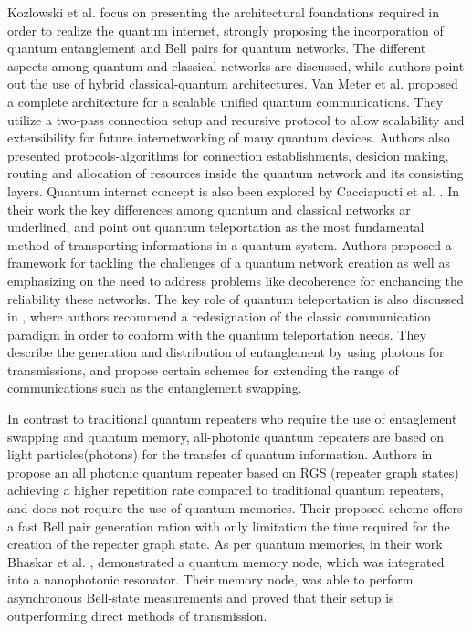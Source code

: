 \documentclass[12pt,a4paper] {report}
\begin{document}
		Kozlowski et al. \cite{rfc} focus on presenting the architectural foundations required in order to
		realize the quantum internet, strongly proposing the incorporation of quantum entanglement and Bell pairs for quantum networks. 
		The different aspects among quantum and classical networks are discussed, while authors point out the use of hybrid
		classical-quantum architectures. Van Meter et al. \cite{quantum-arch} proposed a complete architecture 
		for a scalable unified quantum communications. They utilize a two-pass connection setup and recursive protocol
		to allow scalability and extensibility for future internetworking
		of many quantum devices. Authors also presented protocols-algorithms for connection establishments, desicion making, routing and 
		allocation of resources inside the quantum network and its consisting layers.
		Quantum internet concept is also been explored by Cacciapuoti et al. \cite{net-chall-dqc}.
		In their work the key differences among quantum and classical
		networks ar underlined, and point out quantum teleportation as the most fundamental method of transporting 
		informations in a quantum system. Authors proposed a framework for tackling the challenges of a quantum
		network creation as well as emphasizing on the need to address problems like decoherence for enchancing the
		reliability these networks. The key role of quantum teleportation is also discussed in \cite{entagl-classic},
		where authors recommend a redesignation of the classic communication paradigm in order to conform with the quantum teleportation needs.
		They describe the generation and distribution of entanglement by using photons for transmissions, and propose certain schemes for extending
		the range of communications such as the entanglement swapping.

		In contrast to traditional quantum repeaters who require the use of entaglement swapping and quantum memory, all-photonic quantum repeaters
		are based on light particles(photons) for the transfer of quantum information.
		Authors in \cite{repeater1} propose an all photonic quantum repeater 
		based on RGS (repeater graph states) achieving a higher repetition rate compared to traditional quantum repeaters, and does not require 
		the use of quantum memories. Their proposed scheme offers a fast Bell pair generation ration with only
		limitation the time required for the creation of the repeater graph state. 
		As per quantum memories, in their work Bhaskar et al. \cite{memories}, demonstrated a quantum memory node, which
		was integrated into a nanophotonic resonator. Their memory node, was able to perform asynchronous Bell-state measurements
		and proved that their setup is outperforming direct methods of transmission.
		
\end{document}
